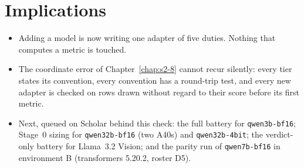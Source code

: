 \section{Implications}

\begin{itemize}
\item Adding a model is now writing one adapter of five duties. Nothing that computes a metric is touched.
\item The coordinate error of Chapter~\ref{chap:s2-8} cannot recur silently: every tier states its
convention, every convention has a round-trip test, and every new adapter is checked on rows drawn without
regard to their score before its first metric.
\item Next, queued on Scholar behind this check: the full battery for \texttt{qwen3b-bf16}; Stage~0 sizing
for \texttt{qwen32b-bf16} (two A40s) and \texttt{qwen32b-4bit}; the verdict-only battery for Llama~3.2
Vision; and the parity run of \texttt{qwen7b-bf16} in environment B (transformers 5.20.2, roster D5).
\end{itemize}
